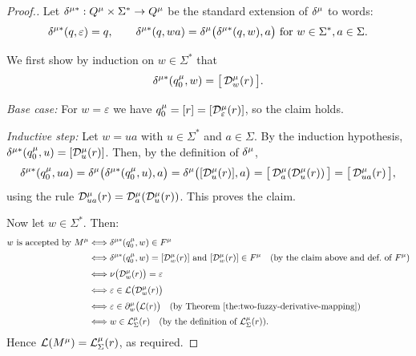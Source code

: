 \begin{proof}[Proof.]
Let $\delta^{\mu *} : Q^\mu \times \Sigma^* \to Q^\mu$ be the standard
extension of $\delta^\mu$ to words:
\[
  \delta^{\mu *}(q,\varepsilon) = q,
  \qquad
  \delta^{\mu *}(q,wa) = \delta^\mu\bigl(\delta^{\mu *}(q,w),a\bigr)
  \text{ for } w \in \Sigma^*, a \in \Sigma.
\]

We first show by induction on $w \in \Sigma^*$ that
\[
  \delta^{\mu *}(q_0^\mu,w) = \bigl[\,\mathcal{D}^\mu_w(r)\,\bigr].
\]

\emph{Base case:} For $w = \varepsilon$ we have
$q_0^\mu = [r] = [\mathcal{D}^\mu_\varepsilon(r)]$, so the claim holds.

\emph{Inductive step:} Let $w = ua$ with $u \in \Sigma^*$ and $a \in \Sigma$.
By the induction hypothesis,
$\delta^{\mu *}(q_0^\mu,u) = [\mathcal{D}^\mu_u(r)]$.
Then, by the definition of $\delta^\mu$,
\[
  \delta^{\mu *}(q_0^\mu,ua)
  = \delta^\mu\bigl(\delta^{\mu *}(q_0^\mu,u),a\bigr)
  = \delta^\mu\bigl([\mathcal{D}^\mu_u(r)],a\bigr)
  = \bigl[\,\mathcal{D}^\mu_a(\mathcal{D}^\mu_u(r))\,\bigr]
  = \bigl[\,\mathcal{D}^\mu_{ua}(r)\,\bigr],
\]
using the rule $\mathcal{D}^\mu_{ua}(r) = \mathcal{D}^\mu_a(\mathcal{D}^\mu_u(r))$.
This proves the claim.

Now let $w \in \Sigma^*$. Then:
\[
\begin{aligned}
w \text{ is accepted by } M^\mu
&\Longleftrightarrow \delta^{\mu *}(q_0^\mu,w) \in F^\mu \\[0.5ex]
&\Longleftrightarrow \delta^{\mu *}(q_0^\mu,w) = [\mathcal{D}^\mu_w(r)]
             \text{ and } [\mathcal{D}^\mu_w(r)] \in F^\mu
             \quad\text{(by the claim above and def.\ of $F^\mu$)} \\[0.5ex]
&\Longleftrightarrow \nu\bigl(\mathcal{D}^\mu_w(r)\bigr) = \varepsilon \\[0.5ex]
&\Longleftrightarrow \varepsilon \in \mathcal{L}\bigl(\mathcal{D}^\mu_w(r)\bigr) \\[0.5ex]
&\Longleftrightarrow \varepsilon \in \partial^\mu_w\bigl(\mathcal{L}(r)\bigr)
     \quad\text{(by Theorem~\ref{the:two-fuzzy-derivative-mapping})} \\[0.5ex]
&\Longleftrightarrow w \in \mathcal{L}^\mu_\Sigma(r)
     \quad\text{(by the definition of $\mathcal{L}^\mu_\Sigma(r)$).}
\end{aligned}
\]
Hence $\mathcal{L}(M^\mu) = \mathcal{L}^\mu_\Sigma(r)$, as required.
\end{proof}

